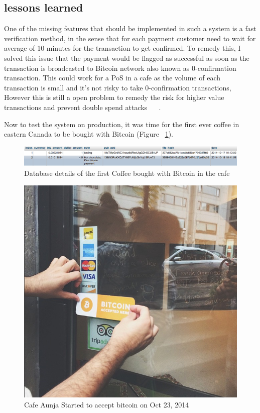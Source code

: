 \subsection{lessons learned}
One of the missing features that should be implemented in such a system is a fast verification method, in the sense that for each payment customer need to wait for average of 10 minutes for the transaction to get confirmed. To remedy this, I solved this issue that the payment would be flagged as successful as soon as the transaction is broadcasted to Bitcoin network also known as 0-confirmation transaction. This could work for a PoS in a cafe as the volume of each transaction is small and it's not risky to take 0-confirmation transactions, However this is still a open problem to remedy the risk for higher value transactions and prevent double spend attacks ~\cite{karame2012two} ~\cite{bamert2013have}.

Now to test the system on production, it was time for the first ever coffee in eastern Canada to be bought with Bitcoin (Figure ~\ref{fig:firsttransaction}).

\begin{figure}[htb]
\centering
\includegraphics[width=\linewidth]{fig/first_cafe_transaction.png}
  \caption{Database details of the first Coffee bought with Bitcoin in the cafe}
\label{fig:firsttransaction}
\end{figure}



\begin{figure}[htb]
\centering
\includegraphics[scale=0.5]{fig/cafeaunja.png}
  \caption{Cafe Aunja Started to accept bitcoin on Oct 23, 2014 }
\label{fig:cafeaunja}
\end{figure}




